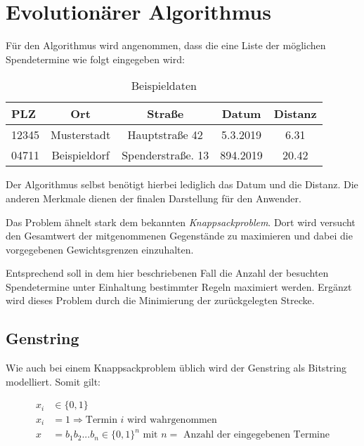 \section{Evolutionärer Algorithmus}\label{sec:evol-alg}
Für den Algorithmus wird angenommen,
dass die eine Liste der möglichen Spendetermine wie folgt eingegeben wird:
\begin{table}[ht]
    \begin{center}
        \begin{tabular}{l|c|c|c|c}
            PLZ     & Ort               &  Straße               & Datum     & Distanz   \\
            \hline
            12345   & Musterstadt       & Hauptstraße 42        & 5.3.2019  & 6.31      \\
            04711   & Beispieldorf      & Spenderstraße. 13     & 894.2019  & 20.42     \\
        \end{tabular}
    \end{center}
    \caption{Beispieldaten}
\end{table}


Der Algorithmus selbst benötigt hierbei lediglich das Datum und die Distanz.
Die anderen Merkmale dienen der finalen Darstellung für den Anwender.

Das Problem ähnelt stark dem bekannten \emph{Knappsackproblem}.
Dort wird versucht den Gesamtwert der mitgenommenen Gegenstände zu maximieren
und dabei die vorgegebenen Gewichtsgrenzen einzuhalten.

Entsprechend soll in dem hier beschriebenen Fall die Anzahl der besuchten Spendetermine unter
Einhaltung bestimmter Regeln maximiert werden.
Ergänzt wird dieses Problem durch die Minimierung der zurückgelegten Strecke.

\subsection{Genstring}
Wie auch bei einem Knappsackproblem üblich wird der Genstring als Bitstring modelliert.
Somit gilt:

\begin{equation}
    \label{eqn:genstring}
    \begin{split}
        x_i &\in \{ 0,1 \} \\
        x_i &= 1 \Rightarrow \text{Termin $i$ wird wahrgenommen} \\
        x   &= b_1b_2...b_n \in \{0,1\}^n\text{ mit $n = $ Anzahl der eingegebenen Termine}
    \end{split}
\end{equation}

